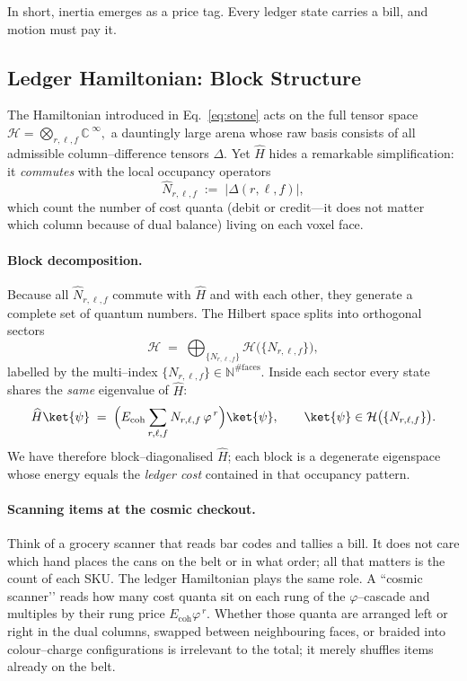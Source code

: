 \documentclass[11pt]{article}
\begin{document}
In short, inertia emerges as a price tag.  Every ledger state carries a bill, and motion must pay it.

\subsection{Ledger Hamiltonian: Block Structure}
\label{subsec:block-structure}

The Hamiltonian introduced in Eq.~\eqref{eq:stone} acts on the full tensor
space 
\(
\mathcal{H}
=\bigotimes_{r,\ell,f}\mathbb{C}^{\;\infty},
\)
a dauntingly large arena whose raw basis consists of all admissible
column–difference tensors \(\Delta\).
Yet \(\widehat{H}\) hides a remarkable simplification: it \emph{commutes}
with the local occupancy operators
\[
\widehat{N}_{r,\ell,f}
\;:=\;
\bigl|\Delta(r,\ell,f)\bigr|,
\]
which count the number of cost quanta (debit or credit—it does not
matter which column because of dual balance) living on each voxel face.

\paragraph{Block decomposition.}
Because all \(\widehat{N}_{r,\ell,f}\) commute with \(\widehat{H}\) and
with each other, they generate a complete set of quantum numbers.  The
Hilbert space splits into orthogonal sectors
\[
\mathcal{H}
\;=\;
\bigoplus_{\{N_{r,\ell,f}\}}
\mathcal{H}\bigl(\{N_{r,\ell,f}\}\bigr),
\]
labelled by the multi–index
\(\{N_{r,\ell,f}\}\in\mathbb{N}^{\#\text{faces}}\).
Inside each sector every state shares the \emph{same} eigenvalue of
\(\widehat{H}\):
\[
\widehat{H}\ket{\psi}
\;=\;
\Bigl(
 E_{\text{coh}}
 \sum_{r,\ell,f}
     N_{r,\ell,f}\,\varphi^{\,r}
\Bigr)
\ket{\psi},
\qquad
\ket{\psi}\in\mathcal{H}\bigl(\{N_{r,\ell,f}\}\bigr).
\]
We have therefore block–diagonalised \(\widehat{H}\); each block is a
degenerate eigenspace whose energy equals the \emph{ledger cost}
contained in that occupancy pattern.

\paragraph{Scanning items at the cosmic checkout.}
Think of a grocery scanner that reads bar codes and tallies a bill.  It
does not care which hand places the cans on the belt or in what order;
all that matters is the count of each SKU.  The ledger Hamiltonian plays
the same role.  A “cosmic scanner’’ reads how many cost quanta sit on
each rung of the $\varphi$–cascade and multiples by their rung price
\(E_{\text{coh}}\varphi^{\,r}\).  Whether those quanta are arranged left
or right in the dual columns, swapped between neighbouring faces, or
braided into colour–charge configurations is irrelevant to the total; it
merely shuffles items already on the belt.  
\end{document}
